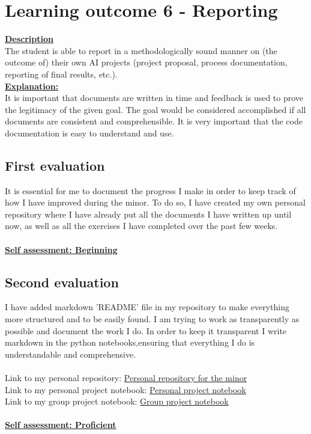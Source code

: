 \documentclass{article}
\begin{document}
\section{Learning outcome 6 - Reporting}
\underline{\textbf{Description}}\\
The student is able to report in a methodologically sound manner on (the outcome of) 
their own AI projects (project proposal, process documentation, reporting of final results, etc.).\\
\underline{\textbf{Explanation:}}\\
It is important that documents are written in time and feedback is used to prove the legitimacy of the given goal. The goal would be considered 
accomplished if all documents are consistent and comprehensible. It is very important that the code documentation is easy
to understand and use.

\subsection{First evaluation}
It is essential for me to document the progress I make in order to keep track of how I have improved during the minor. To do so, 
I have created my own personal repository where I have already put all the documents I have written up until now, as well as all the exercises 
I have completed over the past few weeks.\\\\
\underline{\textbf{Self assessment: Beginning}}

\subsection{Second evaluation}
I have added markdown 'README' file in my repository to make everything more structured and to be easily found. I am trying to work as transparently as
possible and document the work I do. In order to keep it transparent I write markdown in the python notebooks,ensuring that everything I do is 
understandable and comprehensive.\\\\
Link to my personal repository: \href{https://github.com/BurovDanil/MinorAI}{Personal repository for the minor}\\
Link to my personal project notebook: \href{https://github.com/BurovDanil/MinorAI/blob/main/PythonCR/Personal%20project/UfcModel.ipynb}{Personal project notebook}\\
Link to my group project notebook: \href{https://github.com/AI-Farming-Thewi/cows_analysis/blob/stagri-farm-analysis/Stagri%20analysis.ipynb}{Group project notebook}\\\\
\underline{\textbf{Self assessment: Proficient}}
\end{document}
